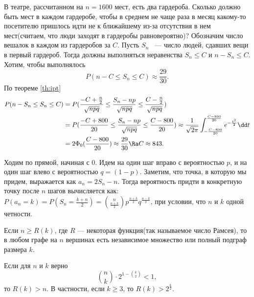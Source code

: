  \begin{example}
     В театре, рассчитанном на $n = 1600$ мест, есть два гардероба.
     Сколько должно быть мест в каждом гардеробе, чтобы в среднем не чаще раза в месяц какому-то посетителю пришлось идти не к ближайшему из-за отсутствия в нем мест(считаем, что люди заходят в гардеробы равновероятно)?
     Обозначим число вешалок в каждом из гардеробов за $C$.
     Пусть $S_n$ ~--- число людей, сдавших вещи в первый гардероб. Тогда должны выполняться неравенства $S_n \le C$ и $n - S_n \le C$.
     Хотим, чтобы выполнялось
     $$P(n - C \le S_n \le C) \approx \frac{29}{30}.$$
    По теореме \ref{th:ipt}
    \begin{align*}
        P(n - S_n \le S_n \le C) &= P(\frac{-C+\frac{n}{2}}{\sqrt{npq}} \le \frac{S_n-np}{\sqrt{npq}} \le \frac{C-\frac{n}{2}}{\sqrt{npq}}) \\&= P(\frac{-C + 800}{20} \le \frac{S_n - np}{\sqrt{npq}}\le \frac{C - 800}{20}) \approx \frac{1}{\sqrt{2\pi}}\int_{-\frac{C - 800}{20}}^{\frac{C - 800}{20}}e^{-\frac{t^2}{2}}\dd t \\&=
         2\Phi_0(\frac{C-800}{20})\approx \frac{29}{30} \Ra C\approx 843.
    \end{align*}
     
 \end{example}
 
 \begin{example} 
     Ходим по прямой, начиная с 0. Идем на один шаг вправо с вероятностью $p$, и на один шаг влево с вероятностью $q=(1-p)$. Заметим, что точка, в которую мы придем, выражается как $a_n = 2S_n - n$. Тогда вероятность придти в конкретную точку после $n$ шагов вычисляется как: $P(a_n = k) = P(S_n = \frac{k+n}{2}) = \binom{n}{\frac{n+k}{2}}p^{\frac{n+k}{2}}q^{\frac{n-k}{2}}$, при условии, что $n$ и $k$ одной четности.
 \end{example}


 \begin{theorem}[Рамсея]
Если $n \ge R(k)$, где $R$ --- некоторая функция(так называемое число Рамсея), то в любом графе на $n$ вершинах есть независимое множество или полный подграф размера $k$.
 \end{theorem}

 \begin{theorem}[Эрдёша]
     Если для $n$ и $k$ верно 
     $$\binom{n}{k}\cdot 2^{1 - \binom{k}{2}} < 1,$$
     то $R(k) > n$. В частности, если $k \ge 3$, то $R(k) > 2^{\frac{k}{2}}$.
 \end{theorem}


